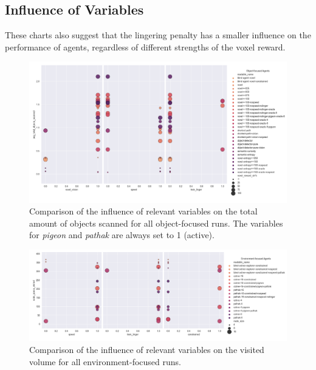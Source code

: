 \newpage 
\subsection{Influence of Variables}  \label{appendix:agent_variables_influence}
    These charts also suggest that the lingering penalty has a smaller influence on the performance of agents, regardless of different strengths of the voxel reward. 

   \begin{figure}[!h]
        \centering
        \includegraphics[width=1\textwidth]{images/results_variables_obj3_detailed.png} 
        \caption{Comparison of the influence of relevant variables on the total amount of objects scanned for all object-focused runs. The variables for \textit{pigeon} and \textit{pathak} are always set to 1 (active).}
        \label{fig:results_variables_obj}
        \end{figure}
        


   \begin{figure}[!h]
        \centering
        \includegraphics[width=1\textwidth]{images/results_variables_env3.png} 
        \caption{Comparison of the influence of relevant variables on the visited volume for all environment-focused runs.}
        \label{fig:results_variables_obj}
        \end{figure}
        

